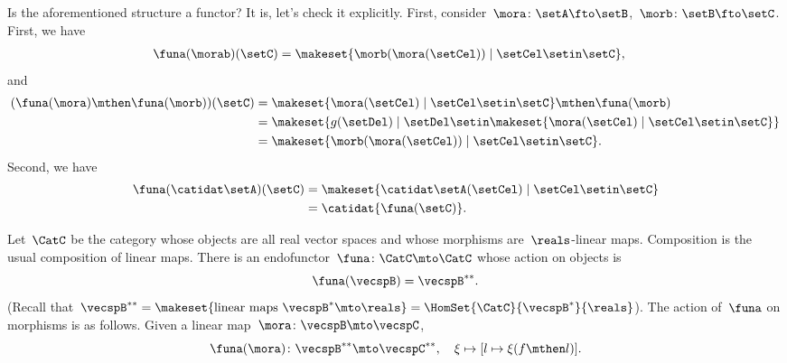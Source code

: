 \begin{example}
    Is the aforementioned structure a functor?
    It is, let's check it explicitly.
    First, consider~$\mora\colon \setA\fto \setB$,~$\morb\colon \setB \fto \setC$.
    First, we have
    \begin{equation}
        \begin{aligned}
            \funa(\morab)(\setC) & =\makeset{ \morb(\mora(\setCel))\mid \setCel \setin \setC},
        \end{aligned}
    \end{equation}
    and
    \begin{equation}
        \begin{aligned}
            (\funa(\mora)\mthen \funa(\morb))(\setC)
             & =\makeset{ \mora(\setCel) \mid \setCel \setin \setC}\mthen \funa(\morb) \\
             & =\makeset{g(\setDel)\mid \setDel \setin \makeset{\mora(\setCel)\mid \setCel\setin \setC}} \\
             & =\makeset{ \morb(\mora(\setCel))\mid \setCel \setin \setC}.
        \end{aligned}
    \end{equation}
    Second, we have
    \begin{equation}
        \begin{aligned}
            \funa(\catidat\setA)(\setC) & = \makeset{\catidat\setA(\setCel)\mid \setCel \setin \setC} \\
                                        & =\catidat{\funa(\setC)}.
        \end{aligned}
    \end{equation}
\end{example}

\begin{example}
    \label{exa:double-dual-functor}
    Let~$\CatC$ be the category whose objects are all real vector spaces and whose morphisms are~$\reals$-linear maps.
    Composition is the usual composition of linear maps.
    There is an endofunctor~$\funa \colon \CatC \mto \CatC$ whose action on objects is
    \begin{equation}
        \funa ( \vecspB ) = \vecspB^{**}.
    \end{equation}
    (Recall that~$\vecspB^{**} = \makeset{ \text{linear maps } \vecspB^* \mto \reals } =  \HomSet{\CatC}{\vecspB^*}{\reals}$).
    The action of~$\funa$ on morphisms is as follows.
    Given a linear map~$\mora \colon \vecspB \mto \vecspC$,
    \begin{equation}
        \funa ( \mora ) \colon \vecspB^{**} \mto \vecspC^{**}, \quad \xi \mapsto [ l \mapsto \xi (f \mthen l)].
    \end{equation}
\end{example}

